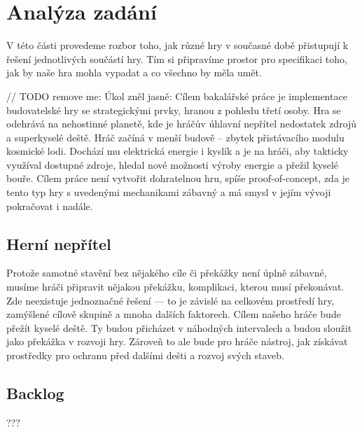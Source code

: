 
\chapter{Analýza zadání}

V této části provedeme rozbor toho, jak různé hry v současné době přistupují k řešení jednotlivých součástí hry. Tím si připravíme prostor pro specifikaci toho, jak by naše hra mohla vypadat a co všechno by měla umět.

// TODO remove me:
Úkol zněl jasně: Cílem bakalářské práce je implementace budovatelské hry se strategickými prvky, hranou z pohledu třetí osoby. Hra se odehrává na nehostinné planetě, kde je hráčův úhlavní nepřítel nedostatek zdrojů a superkyselé deště. Hráč začíná v menší budově – zbytek přistávacího modulu kosmické lodi. Dochází mu elektrická energie i kyslík a je na hráči, aby takticky využíval dostupné zdroje, hledal nové možnosti výroby energie a přežil kyselé bouře. Cílem práce není vytvořit dohratelnou hru, spíše proof-of-concept, zda je tento typ hry s uvedenými mechanikami zábavný a má smysl v jejím vývoji pokračovat i nadále.








\section{Herní nepřítel}
Protože samotné stavění bez nějakého cíle či překážky není úplně zábavné, musíme hráči připravit nějakou překážku, komplikaci, kterou musí překonávat. Zde neexistuje jednoznačné řešení --- to je závislé na celkovém prostředí hry, zamýšlené cílově skupině a mnoha dalších faktorech. Cílem našeho hráče bude přežít kyselé deště. Ty budou přicházet v náhodných intervalech a budou sloužit jako překážka v rozvoji hry. Zároveň to ale bude pro hráče nástroj, jak získávat prostředky pro ochranu před dalšími dešti a rozvoj svých staveb. 

\section{Backlog}


???


